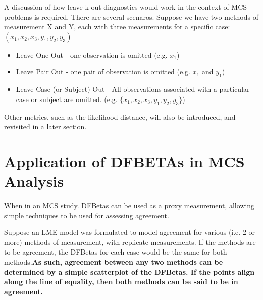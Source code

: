 \documentclass[12pt, a4paper]{report}
\theoremstyle{plain}
\theoremstyle{definition}
\theoremstyle{remark}
\begin{document}
A discussion of how leave-k-out diagnostics would work in the context of MCS problems is required. There are several scenaros. Suppose we have two methods of measurement X and Y, each with three measurements for a specific case: $(x_1,x_2,x_3,y_1,y_2,y_3)$

\begin{itemize}
	\item Leave One Out - one observation is omitted (e.g. $x_1$)
	\item Leave Pair Out - one pair of observation  is omitted (e.g. $x_1$ and $y_1$)
	\item Leave Case (or Subject) Out - All observations associated with a particular case or subject are omitted. (e.g. $\{x_1,x_2,x_3,y_1,y_2,y_3\}$)
\end{itemize}
Other metrics, such as the likelihood distance, will also be introduced, and revisited in a later section.

\section{Application of DFBETAs in MCS Analysis}

When in an MCS study. DFBetas can be used as a proxy measurement, allowing simple techniques to be used for assessing agreement.

Suppose an LME model was formulated to model agreement for various (i.e. 2 or more) methods of measurement, with replicate measurements. If the methods are to be agreement, the DFBetas for each case would be the same for both methods.\textbf{As such, agreement between any two methods can be determined by a simple scatterplot of the DFBetas. If the points align along the line of equality, then both methods can be said to be in agreement.}
\end{document}
